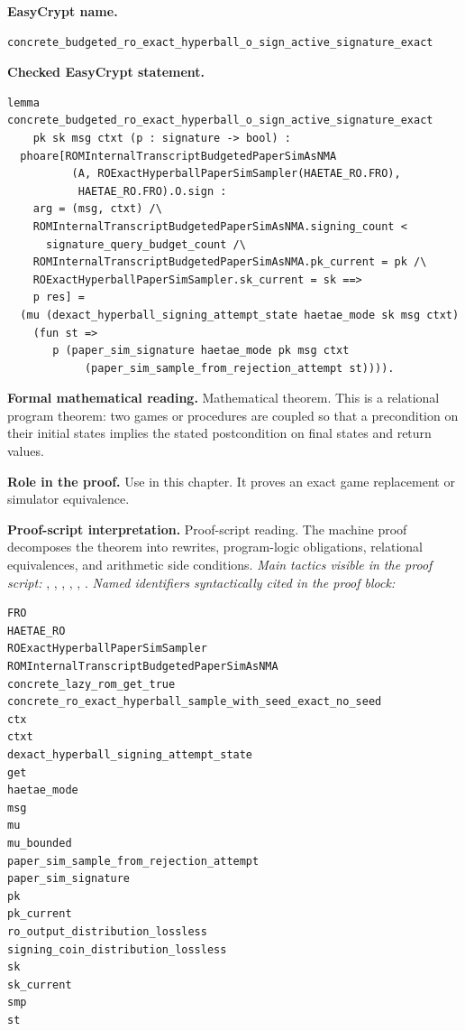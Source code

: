 \begin{formaltheorem}
\noindent\textbf{EasyCrypt name.}
\begin{lstlisting}[language=EasyCrypt,basicstyle=\ttfamily\scriptsize]
concrete_budgeted_ro_exact_hyperball_o_sign_active_signature_exact
\end{lstlisting}
\noindent\textbf{Checked EasyCrypt statement.}
\begin{lstlisting}[language=EasyCrypt,basicstyle=\ttfamily\scriptsize]
lemma concrete_budgeted_ro_exact_hyperball_o_sign_active_signature_exact
    pk sk msg ctxt (p : signature -> bool) :
  phoare[ROMInternalTranscriptBudgetedPaperSimAsNMA
          (A, ROExactHyperballPaperSimSampler(HAETAE_RO.FRO),
           HAETAE_RO.FRO).O.sign :
    arg = (msg, ctxt) /\
    ROMInternalTranscriptBudgetedPaperSimAsNMA.signing_count <
      signature_query_budget_count /\
    ROMInternalTranscriptBudgetedPaperSimAsNMA.pk_current = pk /\
    ROExactHyperballPaperSimSampler.sk_current = sk ==>
    p res] =
  (mu (dexact_hyperball_signing_attempt_state haetae_mode sk msg ctxt)
    (fun st =>
       p (paper_sim_signature haetae_mode pk msg ctxt
            (paper_sim_sample_from_rejection_attempt st)))).
\end{lstlisting}
\noindent\textbf{Formal mathematical reading.}
Mathematical theorem. This is a relational program theorem: two games or procedures are coupled so that a precondition on their initial states implies the stated postcondition on final states and return values.

\noindent\textbf{Role in the proof.}
Use in this chapter. It proves an exact game replacement or simulator equivalence.

\noindent\textbf{Proof-script interpretation.}
Proof-script reading. The machine proof decomposes the theorem into rewrites, program-logic obligations, relational equivalences, and arithmetic side conditions.
\emph{Main tactics visible in the proof script:} , , , , , .
\emph{Named identifiers syntactically cited in the proof block:}
\begin{lstlisting}[language=EasyCrypt,basicstyle=\ttfamily\scriptsize]
FRO
HAETAE_RO
ROExactHyperballPaperSimSampler
ROMInternalTranscriptBudgetedPaperSimAsNMA
concrete_lazy_rom_get_true
concrete_ro_exact_hyperball_sample_with_seed_exact_no_seed
ctx
ctxt
dexact_hyperball_signing_attempt_state
get
haetae_mode
msg
mu
mu_bounded
paper_sim_sample_from_rejection_attempt
paper_sim_signature
pk
pk_current
ro_output_distribution_lossless
signing_coin_distribution_lossless
sk
sk_current
smp
st
\end{lstlisting}

\end{formaltheorem}

